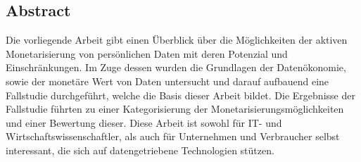 \thispagestyle{empty}
\vspace*{5cm}
\begin{center}
\begin{minipage}{0.9\textwidth}
\chapter*{Abstract}

Die vorliegende Arbeit gibt einen Überblick über die Möglichkeiten der aktiven Monetarisierung von persönlichen Daten mit deren Potenzial und Einschränkungen. Im Zuge dessen wurden die Grundlagen der Datenökonomie, sowie der monetäre Wert von Daten untersucht und darauf aufbauend eine Fallstudie durchgeführt, welche die Basis dieser Arbeit bildet. Die Ergebnisse der Fallstudie führten zu einer Kategorisierung der Monetarisierungsmöglichkeiten und einer Bewertung dieser. Diese Arbeit ist sowohl für IT- und Wirtschaftswissenschaftler, als auch für Unternehmen und Verbraucher selbst interessant, die sich auf datengetriebene Technologien stützen.

\vspace*{1.5cm}
\end{minipage}
\end{center}
\clearpage